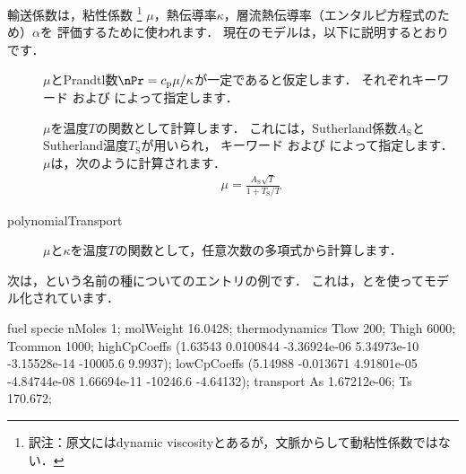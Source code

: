 輸送係数は，粘性係数%
\footnote{訳注：原文にはdynamic viscosityとあるが，文脈からして動粘性係数ではない．}%
$\mu$，熱伝導率$\kappa$，層流熱伝導率（エンタルピ方程式のため）$\alpha$を
評価するために使われます．
現在のモデルは，以下に説明するとおりです．
\begin{description}
 \item[]
            $\mu$とPrandtl数$\nPr = c_{\mathrm{p}}\mu/\kappa$が一定であると仮定します．
            それぞれキーワード
%
%
            および
%
%
            によって指定します．
 \item[]
            $\mu$を温度$T$の関数として計算します．
            これには，Sutherland係数$A_{\mathrm{S}}$とSutherland温度$T_{\mathrm{S}}$が用いられ，
            キーワード
%
%
            および
%
%
            によって指定します．
            $\mu$は，次のように計算されます．
\begin{align}
 \label{eq:7.2}
 \mu = \frac{A_{\mathrm{S}}\sqrt{T}}{1 + T_{\mathrm{S}}/T}
\end{align}
 \item[polynomialTransport]
            $\mu$と$\kappa$を温度$T$の関数として，任意次数の多項式から計算します．
\end{description}
次は，という名前の種についてのエントリの例です．
これは，とを使ってモデル化されています．
%
%
%
%
%
%
%
%
%
%
\begin{OFverbatim}[file]
fuel
{
    specie
    {
        nMoles       1;
        molWeight    16.0428;
    }
    thermodynamics
    {
        Tlow         200;
        Thigh        6000;
        Tcommon      1000;
        highCpCoeffs (1.63543 0.0100844 -3.36924e-06 5.34973e-10
                      -3.15528e-14 -10005.6 9.9937);
        lowCpCoeffs  (5.14988 -0.013671 4.91801e-05 -4.84744e-08
                      1.66694e-11 -10246.6 -4.64132);
    }
    transport
    {
        As           1.67212e-06;
        Ts           170.672;
    }
}
\end{OFverbatim}
